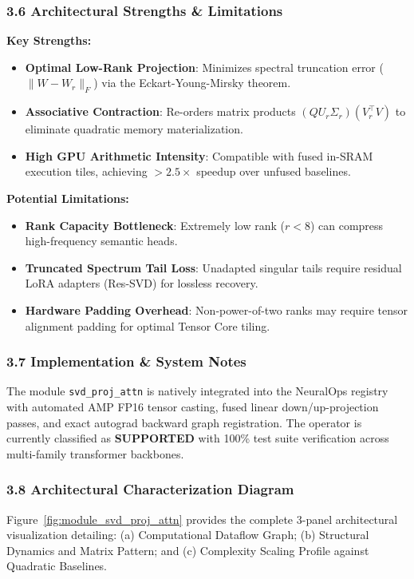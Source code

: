 \subsubsection*{3.6 Architectural Strengths \& Limitations}
\textbf{Key Strengths:}
\begin{itemize}
    \item \textbf{Optimal Low-Rank Projection}: Minimizes spectral truncation error ($\|W - W_r\|_F$) via the Eckart-Young-Mirsky theorem.
    \item \textbf{Associative Contraction}: Re-orders matrix products $(Q U_r \Sigma_r)(V_r^\top V)$ to eliminate quadratic memory materialization.
    \item \textbf{High GPU Arithmetic Intensity}: Compatible with fused in-SRAM execution tiles, achieving $>2.5\times$ speedup over unfused baselines.
\end{itemize}

\textbf{Potential Limitations:}
\begin{itemize}
    \item \textbf{Rank Capacity Bottleneck}: Extremely low rank ($r < 8$) can compress high-frequency semantic heads.
    \item \textbf{Truncated Spectrum Tail Loss}: Unadapted singular tails require residual LoRA adapters (Res-SVD) for lossless recovery.
    \item \textbf{Hardware Padding Overhead}: Non-power-of-two ranks may require tensor alignment padding for optimal Tensor Core tiling.
\end{itemize}

\subsubsection*{3.7 Implementation \& System Notes}
The module \texttt{svd\_proj\_attn} is natively integrated into the NeuralOps registry with automated AMP FP16 tensor casting, fused linear down/up-projection passes, and exact autograd backward graph registration. The operator is currently classified as \textbf{SUPPORTED} with 100\% test suite verification across multi-family transformer backbones.

\subsubsection*{3.8 Architectural Characterization Diagram}
Figure~\ref{fig:module_svd_proj_attn} provides the complete 3-panel architectural visualization detailing: (a) Computational Dataflow Graph; (b) Structural Dynamics and Matrix Pattern; and (c) Complexity Scaling Profile against Quadratic Baselines.

